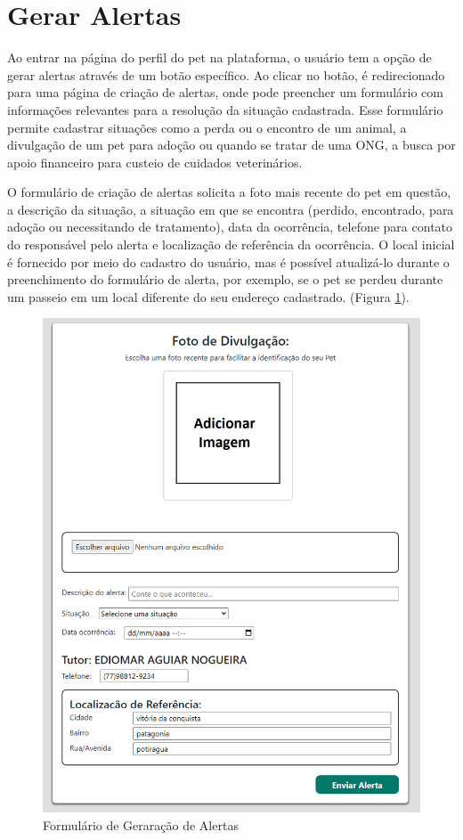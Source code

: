 \newpage
\section{Gerar Alertas}
Ao entrar na página do perfil do pet na plataforma, o usuário tem a opção de gerar alertas através de um botão específico. Ao clicar no botão, é redirecionado para uma página de criação de alertas, onde pode preencher um formulário com informações relevantes para a resolução da situação cadastrada. Esse formulário permite cadastrar situações como a perda ou o encontro de um animal, a divulgação de um pet para adoção ou quando se tratar de uma ONG, a busca por apoio financeiro para custeio de cuidados veterinários.

O formulário de criação de alertas solicita a foto mais recente do pet em questão, a descrição da situação, a situação em que se encontra (perdido, encontrado, para adoção ou necessitando de tratamento), data da ocorrência, telefone para contato do responsável pelo alerta e localização de referência da ocorrência. O local inicial é fornecido por meio do cadastro do usuário, mas é possível atualizá-lo durante o preenchimento do formulário de alerta, por exemplo, se o pet se perdeu durante um passeio em um local diferente do seu endereço cadastrado. (Figura \ref{fig:GerarAlertas}).
\newpage

\begin{figure}[htb]
     \centering
     \includegraphics[width=12cm]{arquivos/Figuras/image1.png}
     \caption{Formulário de Geraração de Alertas}
         \label{fig:GerarAlertas}
\end{figure}


